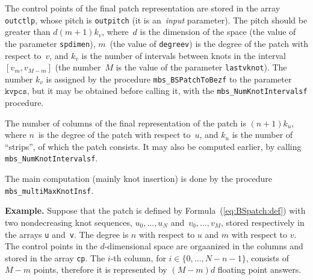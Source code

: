 \begin{sloppypar}
The control points of the final patch representation are stored in the array
\texttt{outctlp}, whose pitch is \texttt{outpitch} (it is an~\emph{input}
parameter). The pitch should be greater than 
$d(m+1)k_v$, where~$d$ is the dimension of the space (the value of the
parameter \texttt{spdimen}), $m$~(the value of \texttt{degreev}) is the degree
of the patch with respect to~$v$, and $k_v$ is the number of intervals between
knots in the interval $[v_m,v_{M-m}]$
(the number~$M$ is the value of the parameter \texttt{lastvknot}).
The number $k_v$ is assigned by the procedure \texttt{mbs\_BSPatchToBezf}
to the parameter $\texttt{kvpcs}$, but it may be obtained before calling it,
with the \texttt{mbs\_NumKnotIntervalsf} procedure.

The number of columns of the final representation of the patch is $(n+1)k_u$,
where $n$~is the degree of the patch with respect to~$u$, and $k_u$ is
the number of ``strips'', of which the patch consists.
It may also be computed earlier, by calling \texttt{mbs\_NumKnotIntervalsf}.
\end{sloppypar}

\begin{sloppypar}
The main computation (mainly knot insertion) is done by the procedure
\texttt{mbs\_multiMaxKnotInsf}.%
\end{sloppypar}


\vspace{\medskipamount}\noindent
\textbf{Example.}
Suppose that the patch is defined by Formula~(\ref{eq:BSpatch:def}) with two
nondecreasing knot sequences, $u_0,\ldots,u_N$ and~$v_0,\ldots,v_M$,
stored respectively in the arrays \texttt{u} and~\texttt{v}.
The degree is $n$ with respect to $u$ and $m$ with respect to $v$.
The control points in the $d$-dimensional space are orgaanized in the columns
and stored in the array \texttt{cp}. The $i$-th column, for
$i\in\{0,\ldots,N-n-1\}$, consists of $M-m$ points, therefore it is
represented by $(M-m)d$ floating point answers.

\vspace{\medskipamount}
\vspace{\medskipamount}

